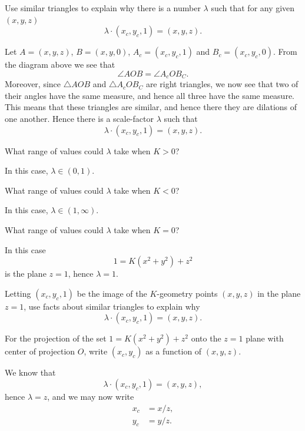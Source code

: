 \documentclass{ximera}
\begin{document}
\begin{problem}
  Use similar triangles to explain why there is a number $\lambda$
  such that for any given $(x,y,z)$
  \[
  \lambda\cdot(x_c,y_c,1) = (x,y,z).
  \]
  \begin{freeResponse}
    Let $A = (x,y,z)$, $B= (x,y,0)$, $A_c = (x_c,y_c,1)$ and
    $B_c=(x_c,y_c,0)$. From the diagram above we see that
    \[
    \angle AOB = \angle A_c O B_C.
    \]
    Moreover, since $\triangle AOB$ and $\triangle A_c O B_C$ are
    right triangles, we now see that two of their angles have the same
    measure, and hence all three have the same measure. This means
    that these triangles are similar, and hence there they are
    dilations of one another. Hence there is a scale-factor $\lambda$
    such that
    \[
    \lambda\cdot(x_c,y_c,1) = (x,y,z).
    \]
  \end{freeResponse}
\end{problem}


\begin{problem}
  What range of values could $\lambda$ take when $K>0$?
  \begin{freeResponse}
    In this case, $\lambda\in (0,1)$.
  \end{freeResponse}
\end{problem}

\begin{problem}
  What range of values could $\lambda$ take when $K<0$?
  \begin{freeResponse}
    In this case, $\lambda\in(1,\infty)$.
  \end{freeResponse}
\end{problem}

\begin{problem}
  What range of values could $\lambda$ take when $K=0$?
  \begin{freeResponse}
    In this case
    \[
    1=K\left(x^{2}+y^{2}\right)+z^{2} 
    \]
    is the plane $z = 1$, hence $\lambda=1$.
  \end{freeResponse}
\end{problem}

\begin{problem}
  Letting $(x_c,y_c,1)$ be the image of the $K$-geometry points
  $(x,y,z)$ in the plane $z=1$, use facts about similar triangles to
  explain why
  \[
  \lambda\cdot(x_{c},y_{c},1)=(x,y,z).
  \]
\end{problem}


\begin{problem}
  For the projection of the set $1=K\left(x^{2}+y^{2}\right)+z^{2}$
  onto the $z=1$ plane with center of projection $O$, write
  $(x_{c},y_{c})$ as a function of $(x,y,z)$.
  \begin{freeResponse}
    We know that
    \[
    \lambda\cdot(x_{c},y_{c},1)=(x,y,z),
    \]
    hence $\lambda=z$, and we may now write
    \begin{align*}
      x_{c} &=x/z,\\
      y_{c} &=y/z.
    \end{align*}
  \end{freeResponse}
\end{problem}
\end{document}
